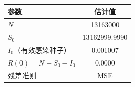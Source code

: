 \begin{tabular}{lc}
\toprule
参数 & 估计值 \\
\midrule
$N$ & 13163000 \\
$S_0$ & 13162999.9990 \\
$I_0$（有效感染种子） & 0.001007 \\
$R(0)=N-S_0-I_0$ & 0.0000 \\
残差准则 & MSE \\
\bottomrule
\end{tabular}
